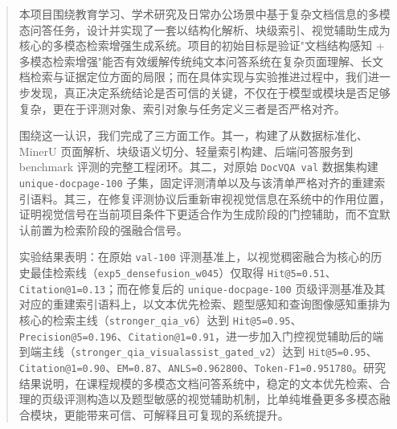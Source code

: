 \documentclass{SYSUReport}
\date{\today}
\begin{document}
\cover
\thispagestyle{empty}
\clearpage

\begin{abstract}

本项目围绕教育学习、学术研究及日常办公场景中基于复杂文档信息的多模态问答任务，设计并实现了一套以结构化解析、块级索引、视觉辅助生成为核心的多模态检索增强生成系统。项目的初始目标是验证"文档结构感知 + 多模态检索增强"能否有效缓解传统纯文本问答系统在复杂页面理解、长文档检索与证据定位方面的局限；而在具体实现与实验推进过程中，我们进一步发现，真正决定系统结论是否可信的关键，不仅在于模型或模块是否足够复杂，更在于评测对象、索引对象与任务定义三者是否严格对齐。

围绕这一认识，我们完成了三方面工作。其一，构建了从数据标准化、MinerU 页面解析、块级语义切分、轻量索引构建、后端问答服务到 benchmark 评测的完整工程闭环。其二，对原始 \texttt{DocVQA val} 数据集构建 \texttt{unique-docpage-100} 子集，固定评测清单以及与该清单严格对齐的重建索引语料。其三，在修复评测协议后重新审视视觉信息在系统中的作用位置，证明视觉信号在当前项目条件下更适合作为生成阶段的门控辅助，而不宜默认前置为检索阶段的强融合信号。

实验结果表明：在原始 \texttt{val-100} 评测基准上，以视觉稠密融合为核心的历史最佳检索线（\texttt{exp5\_densefusion\_w045}）仅取得 \texttt{Hit@5=0.51}、\texttt{Citation@1=0.13}；而在修复后的 \texttt{unique-docpage-100} 页级评测基准及其对应的重建索引语料上，以文本优先检索、题型感知和查询图像感知重排为核心的检索主线（\texttt{stronger\_qia\_v6}）达到 \texttt{Hit@5=0.95}、\texttt{Precision@5=0.196}、\texttt{Citation@1=0.91}，进一步加入门控视觉辅助后的端到端主线（\texttt{stronger\_qia\_visualassist\_gated\_v2}）达到 \texttt{Hit@5=0.95}、\texttt{Citation@1=0.90}、\texttt{EM=0.87}、\texttt{ANLS=0.962800}、\texttt{Token-F1=0.951780}。研究结果说明，在课程规模的多模态文档问答系统中，稳定的文本优先检索、合理的页级评测构造以及题型敏感的视觉辅助机制，比单纯堆叠更多多模态融合模块，更能带来可信、可解释且可复现的系统提升。

\end{abstract}
\thispagestyle{empty}
\clearpage

\setcounter{page}{1}
\tableofcontents
\clearpage

\setcounter{page}{1}
\end{document}
